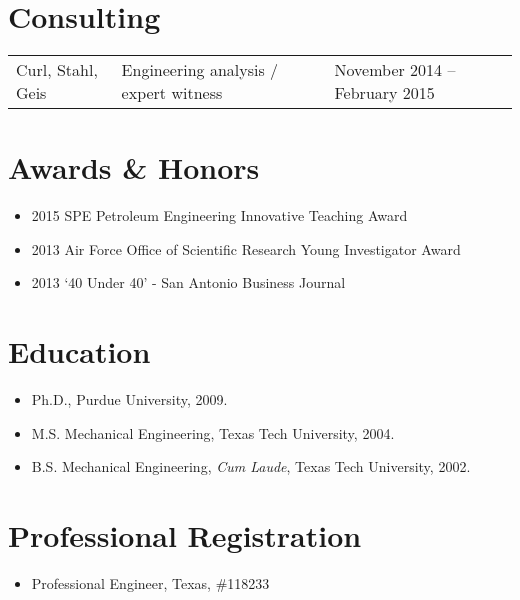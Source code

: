 \section*{Consulting}

\begin{tabular}{lll}
    Curl, Stahl, Geis  & Engineering analysis / expert witness  & November 2014 -- February 2015
\end{tabular}

\section*{Awards \& Honors}

\begin{itemize}
    \item 2015 SPE Petroleum Engineering Innovative Teaching Award 
    \item 2013 Air Force Office of Scientific Research Young Investigator Award
    \item 2013 `40 Under 40' - San Antonio Business Journal
\end{itemize}
\else
\section*{Education}

\begin{itemize}
    \item Ph.D., Purdue University, 2009.
    \item M.S. Mechanical Engineering, Texas Tech University, 2004.
    \item B.S. Mechanical Engineering, \textit{Cum Laude},
    Texas Tech University, 2002.
\end{itemize}

\section*{Professional Registration}

\begin{itemize}
    \item Professional Engineer, Texas, \#118233
\end{itemize}


